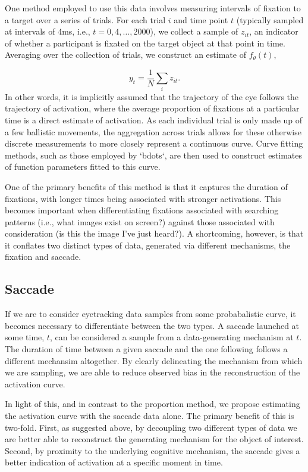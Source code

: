 \documentclass{article}
\begin{document}
One method employed to use this data involves measuring intervals of fixation to a target over a series of trials. For each trial $i$ and time point $t$ (typically sampled at intervals of 4ms, i.e., $t = 0, 4, \dots, 2000$), we collect a sample of $z_{it}$, an indicator of whether a participant is fixated on the target object at that point in time. Averaging over the collection of trials, we construct an estimate of $f_{\theta}(t)$, 

$$
y_t = \frac{1}{N} \sum_{i} z_{it}.
$$
In other words, it is implicitly assumed that the trajectory of the eye follows the trajectory of activation, where the average proportion of fixations at a particular time is a direct estimate of activation. As each individual trial is only made up of a few ballistic movements, the aggregation across trials allows for these otherwise discrete measurements to more closely represent a continuous curve. Curve fitting methods, such as those employed by `bdots`, are then used to construct estimates of function parameters fitted to this curve.

One of the primary benefits of this method is that it captures the duration of fixations, with longer times being associated with stronger activations. This becomes important when differentiating fixations associated with searching patterns (i.e., what images exist on screen?) against those associated with consideration (is this the image I've just heard?). A shortcoming, however, is that it conflates two distinct types of data, generated via different mechanisms, the fixation and saccade. 

\subsection{Saccade}

If we are to consider eyetracking data samples from some probabalistic curve, it becomes necessary to differentiate between the two types. A saccade launched at some time, $t$, can be considered a sample from a data-generating mechanism at $t$. The duration of time between a given saccade and the one following follows a different mechansim altogether. By clearly delineating the mechanism from which we are sampling, we are able to reduce observed bias in the reconstruction of the activation curve.

In light of this, and in contrast to the proportion method, we propose estimating the activation curve with the saccade data alone. The primary benefit of this is two-fold. First, as suggested above, by decoupling two different types of data we are better able to reconstruct the generating mechanism for the object of interest. Second, by proximity to the underlying cognitive mechanism, the saccade gives a better indication of activation at a specific moment in time.
\end{document}
